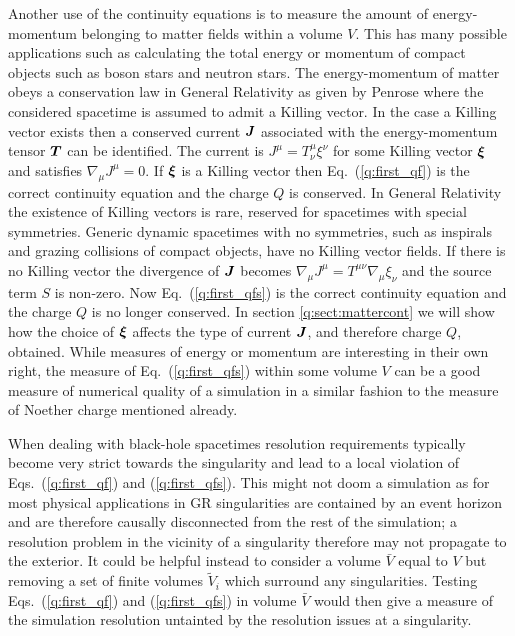 Another use of the continuity equations is to measure the amount of energy-momentum belonging to matter fields within a volume $V$. This has many possible applications such as calculating the total energy or momentum of compact objects such as boson stars and neutron stars. The energy-momentum of matter obeys a conservation law in General Relativity as given by Penrose \cite{10.2307/2397365} where the considered spacetime is assumed to admit a Killing vector. In the case a Killing vector exists then a conserved current $\boldsymbol{J}$ associated with the energy-momentum tensor $\boldsymbol{T}$ can be identified. The current is $J^\mu = T^\mu_\nu \xi^\nu$ for some Killing vector $\boldsymbol{\xi}$ and satisfies $\nabla_\mu J^\mu = 0$. If $\boldsymbol{\xi}$ is a Killing vector then Eq.~(\ref{q:first_qf}) is the correct continuity equation and the charge $Q$ is conserved. In General Relativity the existence of Killing vectors is rare, reserved for spacetimes with special symmetries. Generic dynamic spacetimes with no symmetries, such as inspirals and grazing collisions of compact objects, have no Killing vector fields. If there is no Killing vector the divergence of $\boldsymbol{J}$ becomes $\nabla_\mu J^\mu = T^{\mu\nu}\nabla_\mu \xi_\nu$ and the source term ${S}$ is non-zero. Now Eq.~(\ref{q:first_qfs}) is the correct continuity equation and the charge $Q$ is no longer conserved. In section \ref{q:sect:mattercont} we will show how the choice of $\boldsymbol{\xi}$ affects the type of current $\boldsymbol{J}$, and therefore charge $Q$, obtained. While measures of energy or momentum are interesting in their own right, the measure of Eq.~(\ref{q:first_qfs}) within some volume ${V}$ can be a good measure of numerical quality of a simulation in a similar fashion to the measure of Noether charge mentioned already.

When dealing with black-hole spacetimes resolution requirements typically become very strict towards the singularity and lead to a local violation of Eqs.~(\ref{q:first_qf}) and (\ref{q:first_qfs}). This might not doom a simulation as for most physical applications in GR singularities are contained by an event horizon and are therefore causally disconnected from the rest of the simulation; a resolution problem in the vicinity of a singularity therefore may not propagate to the exterior. It could be helpful instead to consider a volume $\bar{V}$ equal to $V$ but removing a set of finite volumes $\tilde{V}_i$ which surround any singularities. Testing Eqs.~(\ref{q:first_qf}) and (\ref{q:first_qfs}) in volume $\bar{V}$ would then give a measure of the simulation resolution untainted by the resolution issues at a singularity.

